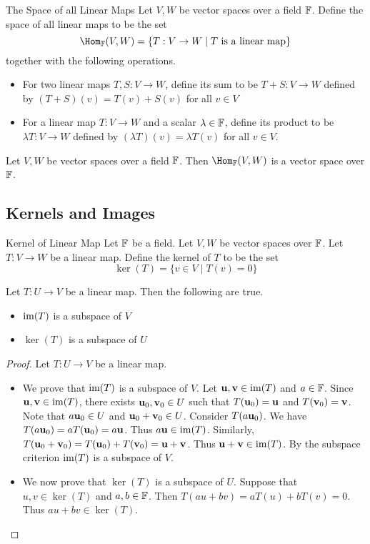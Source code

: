 \documentclass[a4paper]{article}
\begin{document}
\begin{defn}{The Space of all Linear Maps}{} Let $V,W$ be vector spaces over a field $\mathbb{F}$. Define the space of all linear maps to be the set $$\Hom_\F(V,W)=\{T:V\to W\;|\;T\text{ is a linear map}\}$$ together with the following operations. 
\begin{itemize}
\item For two linear maps $T,S:V\to W$, define its sum to be $T+S:V\to W$ defined by $(T+S)(v)=T(v)+S(v)$ for all $v\in V$
\item For a linear map $T:V\to W$ and a scalar $\lambda\in\mathbb{F}$, define its product to be $\lambda T:V\to W$ defined by $(\lambda T)(v)=\lambda T(v)$ for all $v\in V$. 
\end{itemize}
\end{defn}

\begin{lmm}{}{} Let $V,W$ be vector spaces over a field $\mathbb{F}$. Then $\Hom_\F(V,W)$ is a vector space over $\mathbb{F}$. 
\end{lmm}

\subsection{Kernels and Images}
\begin{defn}{Kernel of Linear Map}{} Let $\mathbb{F}$ be a field. Let $V,W$ be vector spaces over $\mathbb{F}$. Let $T:V\to W$ be a linear map. Define the kernel of $T$ to be the set $$\ker(T)=\{v\in V\;|\;T(v)=0\}$$
\end{defn}

\begin{prp}{}{} Let $T:U\to V$ be a linear map. Then the following are true. 
\begin{itemize}
\item $\operatorname{im}(T)$ is a subspace of $V$
\item $\ker(T)$ is a subspace of $U$
\end{itemize}
\begin{proof} Let $T:U\to V$ be a linear map. 
\begin{itemize}
\item We prove that $\operatorname{im}(T)$ is a subspace of $V$. Let $\vb{u},\vb{v}\in\operatorname{im}(T)$ and $a\in\mathbb{F}$. Since $\vb{u},\vb{v}\in\operatorname{im}(T)$, there exists $\vb{u}_0,\vb{v}_0\in U$ such that $T(\vb{u}_0)=\vb{u}$ and $T(\vb{v}_0)=\vb{v}$. Note that $a\vb{u}_0\in U$ and $\vb{u}_0+\vb{v}_0\in U$. Consider $T(a\vb{u}_0)$. We have $T(a\vb{u}_0)=aT(\vb{u}_0)=a\vb{u}$. Thus $a\vb{u}\in\operatorname{im}(T)$. Similarly, $T(\vb{u}_0+\vb{v}_0)=T(\vb{u}_0)+T(\vb{v}_0)=\vb{u}+\vb{v}$. Thus $\vb{u}+\vb{v}\in\operatorname{im}(T)$. By the subspace criterion $\operatorname{im}(T)$ is a subspace of $V$. 
\item We now prove that $\ker(T)$ is a subspace of $U$. Suppose that $u,v\in\ker(T)$ and $a,b\in\mathbb{F}$. Then $T(au+bv)=aT(u)+bT(v)=0$. Thus $au+bv\in\ker(T)$. 
\end{itemize}
\end{proof}
\end{prp}
\end{document}
